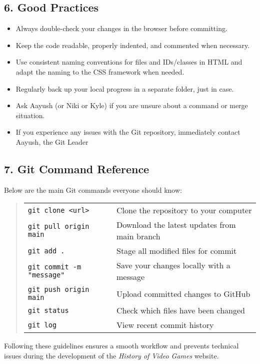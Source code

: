 \documentclass[a4paper,12pt]{article}
\begin{document}
\begin{itemize}[leftmargin=1.2cm]
\subsection*{6. Good Practices}
\begin{itemize}[leftmargin=1.2cm]
    \item Always double-check your changes in the browser before committing.
    \item Keep the code readable, properly indented, and commented when necessary.
    \item Use consistent naming conventions for files and IDs/classes in HTML and adapt the naming to the CSS framework when needed.
    \item Regularly back up your local progress in a separate folder, just in case.
    \item Ask Aayush (or Niki or Kyle) if you are unsure about a command or merge situation.
    \item If you experience any issues with the Git repository, immediately contact Aayush, the Git Leader
\end{itemize}

\vspace{0.3cm}
\subsection*{7. Git Command Reference}
\noindent
Below are the main Git commands everyone should know:
\begin{quote}
\begin{tabular}{ll}
\texttt{git clone <url>} & Clone the repository to your computer \\
\texttt{git pull origin main} & Download the latest updates from main branch \\
\texttt{git add .} & Stage all modified files for commit \\
\texttt{git commit -m "message"} & Save your changes locally with a message \\
\texttt{git push origin main} & Upload committed changes to GitHub \\
\texttt{git status} & Check which files have been changed \\
\texttt{git log} & View recent commit history \\
\end{tabular}
\end{quote}

\vspace{0.5cm}
\noindent
Following these guidelines ensures a smooth workflow and prevents technical issues during the development of the \textit{History of Video Games} website.


\end{itemize}
\end{document}
